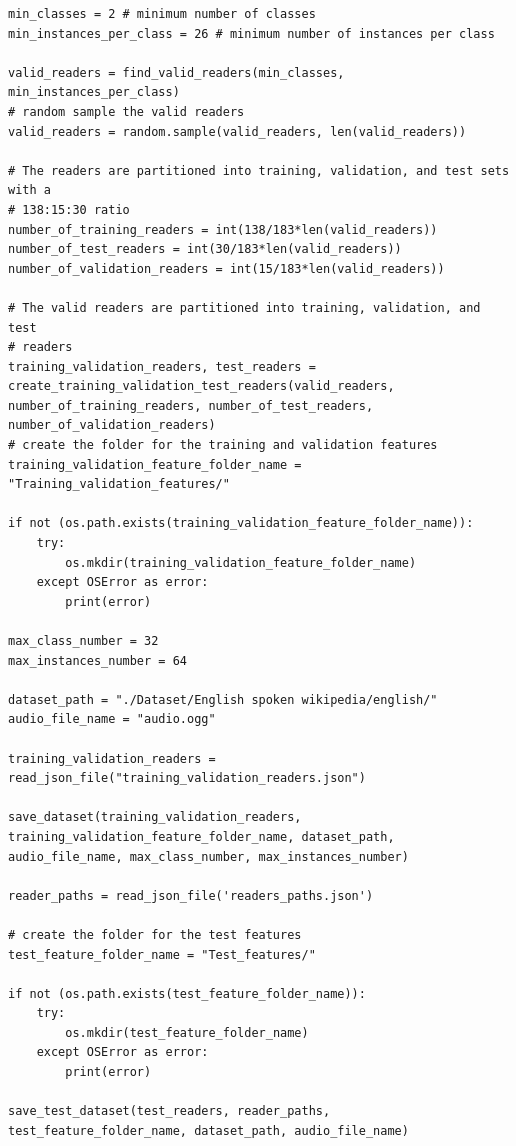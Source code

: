 \documentclass[12pt,a4paper,titlepage]{article}
\begin{document}
\begin{lstlisting}[language=iPython,firstnumber=262, caption=preprocessing.py, label=preprocessing,captionpos=b]
min_classes = 2 # minimum number of classes
min_instances_per_class = 26 # minimum number of instances per class

valid_readers = find_valid_readers(min_classes, min_instances_per_class)
# random sample the valid readers
valid_readers = random.sample(valid_readers, len(valid_readers))

# The readers are partitioned into training, validation, and test sets with a 
# 138:15:30 ratio
number_of_training_readers = int(138/183*len(valid_readers))
number_of_test_readers = int(30/183*len(valid_readers))
number_of_validation_readers = int(15/183*len(valid_readers))

# The valid readers are partitioned into training, validation, and test
# readers 
training_validation_readers, test_readers = create_training_validation_test_readers(valid_readers, number_of_training_readers, number_of_test_readers, number_of_validation_readers)
# create the folder for the training and validation features
training_validation_feature_folder_name = "Training_validation_features/"

if not (os.path.exists(training_validation_feature_folder_name)):
    try:
        os.mkdir(training_validation_feature_folder_name)
    except OSError as error:
        print(error)   

max_class_number = 32
max_instances_number = 64

dataset_path = "./Dataset/English spoken wikipedia/english/"
audio_file_name = "audio.ogg"

training_validation_readers = read_json_file("training_validation_readers.json")

save_dataset(training_validation_readers, training_validation_feature_folder_name, dataset_path, audio_file_name, max_class_number, max_instances_number)

reader_paths = read_json_file('readers_paths.json')

# create the folder for the test features
test_feature_folder_name = "Test_features/"

if not (os.path.exists(test_feature_folder_name)):
    try:
        os.mkdir(test_feature_folder_name)
    except OSError as error:
        print(error)   

save_test_dataset(test_readers, reader_paths, test_feature_folder_name, dataset_path, audio_file_name)
\end{lstlisting}
\end{document}
